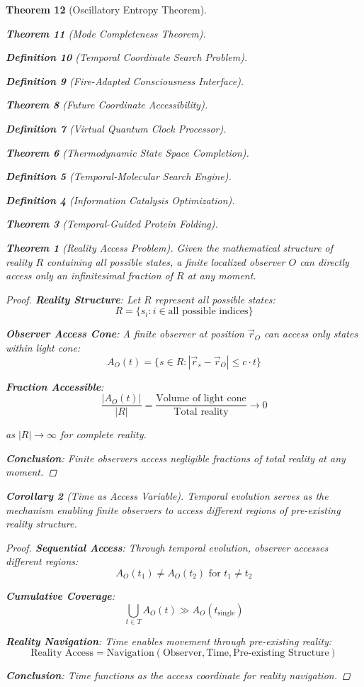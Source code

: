 \documentclass[12pt,a4paper]{article}
\newtheorem{theorem}{Theorem}[section]
\newtheorem{corollary}[theorem]{Corollary}
\newtheorem{definition}[theorem]{Definition}
\begin{document}
\begin{theorem}[Oscillatory Entropy Theorem]
\begin{theorem}[Mode Completeness Theorem]
\begin{enumerate}
\begin{definition}[Temporal Coordinate Search Problem]
\begin{algorithm}
\begin{definition}[Fire-Adapted Consciousness Interface]
\begin{theorem}[Future Coordinate Accessibility]
\begin{definition}[Virtual Quantum Clock Processor]
\begin{itemize}
\begin{itemize}
\begin{theorem}[Thermodynamic State Space Completion]
\begin{definition}[Temporal-Molecular Search Engine]
\begin{definition}[Information Catalysis Optimization]
\begin{algorithm}
\begin{theorem}[Temporal-Guided Protein Folding]
\begin{table}[h]
\begin{theorem}[Reality Access Problem]
Given the mathematical structure of reality $R$ containing all possible states, a finite localized observer $O$ can directly access only an infinitesimal fraction of $R$ at any moment.
\end{theorem}

\begin{proof}
\textbf{Reality Structure}: Let $R$ represent all possible states:
$$R = \{s_i : i \in \text{all possible indices}\}$$

\textbf{Observer Access Cone}: A finite observer at position $\vec{r}_O$ can access only states within light cone:
$$A_O(t) = \{s \in R : |\vec{r}_s - \vec{r}_O| \leq c \cdot t\}$$

\textbf{Fraction Accessible}:
$$\frac{|A_O(t)|}{|R|} = \frac{\text{Volume of light cone}}{\text{Total reality}} \to 0$$

as $|R| \to \infty$ for complete reality.

\textbf{Conclusion}: Finite observers access negligible fractions of total reality at any moment.
\end{proof}

\begin{corollary}[Time as Access Variable]
Temporal evolution serves as the mechanism enabling finite observers to access different regions of pre-existing reality structure.
\end{corollary}

\begin{proof}
\textbf{Sequential Access}: Through temporal evolution, observer accesses different regions:
$$A_O(t_1) \neq A_O(t_2) \text{ for } t_1 \neq t_2$$

\textbf{Cumulative Coverage}:
$$\bigcup_{t \in T} A_O(t) \gg A_O(t_{\text{single}})$$

\textbf{Reality Navigation}: Time enables movement through pre-existing reality:
$$\text{Reality Access} = \text{Navigation}(\text{Observer}, \text{Time}, \text{Pre-existing Structure})$$

\textbf{Conclusion}: Time functions as the access coordinate for reality navigation.
\end{proof}


\end{table}
\end{theorem}
\end{algorithm}
\end{definition}
\end{definition}
\end{theorem}
\end{itemize}
\end{itemize}
\end{definition}
\end{theorem}
\end{definition}
\end{algorithm}
\end{definition}
\end{enumerate}
\end{theorem}
\end{theorem}
\end{document}
